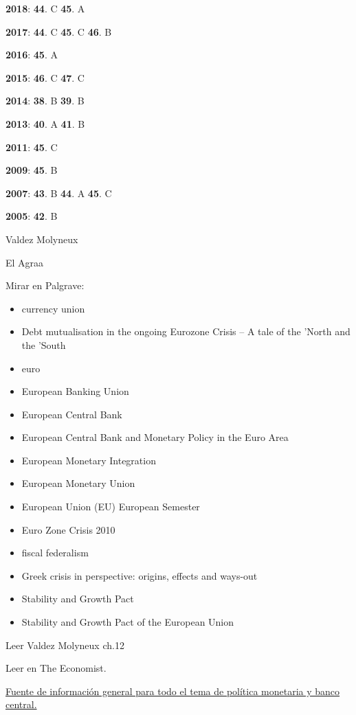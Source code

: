 \documentclass{nuevotema}
\begin{document}
\notas

\textbf{2018}: \textbf{44}. C \textbf{45}. A

\textbf{2017}: \textbf{44}. C \textbf{45}. C \textbf{46}. B

\textbf{2016}: \textbf{45}. A

\textbf{2015}: \textbf{46}. C \textbf{47}. C

\textbf{2014}: \textbf{38}. B \textbf{39}. B

\textbf{2013}: \textbf{40}. A \textbf{41}. B

\textbf{2011}: \textbf{45}. C

\textbf{2009}: \textbf{45}. B

\textbf{2007}: \textbf{43}. B \textbf{44}. A \textbf{45}. C

\textbf{2005}: \textbf{42}. B

\bibliografia

Valdez Molyneux

El Agraa

Mirar en Palgrave:
\begin{itemize}
    \item currency union
    \item Debt mutualisation in the ongoing Eurozone Crisis -- A tale of the 'North and the 'South
    \item euro
	\item European Banking Union
	\item European Central Bank
	\item European Central Bank and Monetary Policy in the Euro Area
	\item European Monetary Integration
	\item European Monetary Union
	\item European Union (EU) European Semester
	\item Euro Zone Crisis 2010
	\item fiscal federalism
	\item Greek crisis in perspective: origins, effects and ways-out
	\item Stability and Growth Pact
	\item Stability and Growth Pact of the European Union
\end{itemize}

Leer Valdez Molyneux ch.12 

Leer  en The Economist.

\href{https://www.ecb.europa.eu/mopo/eaec/html/index.en.html}{Fuente de información general para todo el tema de política monetaria y banco central.}
\end{document}
